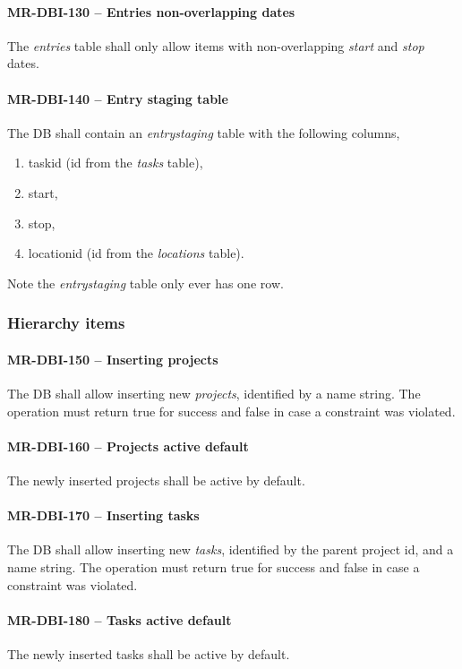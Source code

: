 \paragraph{MR-DBI-130 -- Entries non-overlapping dates}
The \emph{entries} table shall only allow items with non-overlapping
\emph{start} and \emph{stop} dates.

\paragraph{MR-DBI-140 -- Entry staging table}
The \gls{DB} shall contain an \emph{entrystaging} table with the following
columns,
\begin{enumerate}
\item task\textunderscore id (id from the \emph{tasks} table),
\item start,
\item stop,
\item location\textunderscore id (id from the \emph{locations} table).
\end{enumerate}

Note the \emph{entrystaging} table only ever has one row.

\subsubsection{Hierarchy items}
\paragraph{MR-DBI-150 -- Inserting projects}
The \gls{DB} shall allow inserting new \emph{projects}, identified by a name
string. The operation must return true for success and false in case
a constraint was violated.

\paragraph{MR-DBI-160 -- Projects active default}
The newly inserted projects shall be active by default.

\paragraph{MR-DBI-170 -- Inserting tasks}
The \gls{DB} shall allow inserting new \emph{tasks}, identified by the parent
project id, and a name string. The operation must return true for success
and false in case a constraint was violated.

\paragraph{MR-DBI-180 -- Tasks active default}
The newly inserted tasks shall be active by default.

